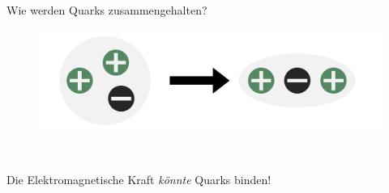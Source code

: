 \begin{frame}{Wie werden Quarks zusammengehalten?}  
    \begin{figure}[htb]
        \includegraphics[width=1\textwidth]{Figures Introductory Lecture/Standard Model/StrongForce_EM.png}
        \label{fig:strong_force_1}
    \end{figure} \\
    \Large \begin{center}
        Die Elektromagnetische Kraft \emph{könnte} Quarks binden!
    \end{center}
\end{frame}

